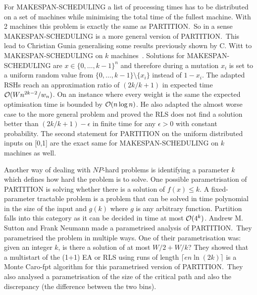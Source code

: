 For MAKESPAN-SCHEDULING a list of processing times has to be distributed on a set of machines while minimising the total time of the fullest machine.
With 2 machines this problem is exactly the same as PARTITION.\
So in a sense MAKESPAN-SCHEDULING is a more general version of PARTITION.\
This lead to Christian Gunia generalising some results previously shown by C. Witt to MAKESPAN-SCHEDULING on $k$ machines~\cite{gunia2005analysis}.
Solutions for MAKESPAN-SCHEDULING are \(x\in{\{0,\dots,k-1\}}^n\) and therefore during a mutation $x_i$ is set to a uniform random value from $\{0,\dots,k-1\}\text{\textbackslash}\{x_i\}$ instead of $1-x_i$.
The adapted RSHs reach an approximation ratio of $(2k/k+1)$ in expected time $\mathcal{O}(Wn^{2k-2}/w_n)$.
On an instance where every weight is the same the expected optimisation time is bounded by $\mathcal{O}(n\log{n})$.
He also adapted the almost worse case to the more general problem and proved the RLS does not find a solution better than \((2k/k+1)-\epsilon\) in finite time for any $\epsilon>0$ with constant probability.
The second statement for PARTITION on the uniform distributed inputs on [0,1] are the exact same for MAKESPAN-SCHEDULING on $k$ machines as well.

Another way of dealing with $NP$-hard problems is identifying a parameter $k$ which defines how hard the problem is to solve.
One possible parametrisation of PARTITION is solving whether there is a solution of $f(x)\le k$.
A fixed-parameter tractable problem is a problem that can be solved in time polynomial in the size of the input and $g(k)$ where $g$ is any arbitrary function.
Partition falls into this category as it can be decided in time at most $\mathcal{O}(4^k)$\cite{fernau2005parameterized}.
Andrew M. Sutton and Frank Neumann made a parametrised analysis of PARTITION\cite{sutton2012parameterized}.\
They parametrised the problem in multiple ways.
One of their parametrisation was: given an integer $k$, is there a solution of at most $W/2+W/k$?
They showed that a multistart of the (1+1) EA or RLS using runs of length \(\lceil en\ln(2k)\rceil\) is a Monte Caro-fpt algorithm for this parametrised version of PARTITION.\
They also analysed a parametrisation of the size of the critical path and also the discrepancy (the difference between the two bins).

